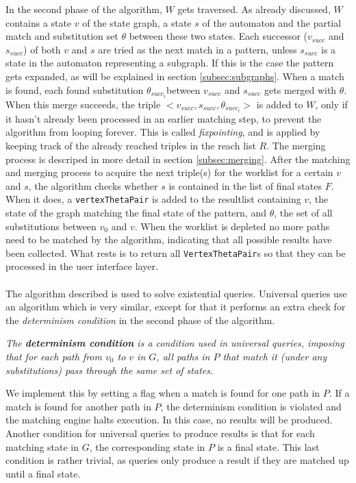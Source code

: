 In the second phase of the algorithm, $W$ gets traversed. As already discussed, $W$ contains a state $v$ of the state graph, a state $s$ of the automaton and the partial match and substitution set $\theta$ between these two states. Each successor ($v_{succ}$ and $s_{succ}$) of both $v$ and $s$ are tried as the next match in a pattern, unless $s_{succ}$ is a state in the automaton representing a subgraph. If this is the case the pattern gets expanded, as will be explained in section \ref{subsec:subgraphs}. When a match is found, each found substitution $\theta_{succ_i}$between $v_{succ}$ and $s_{succ}$ gets merged with $\theta$. When this merge succeeds, the triple $<v_{succ}, s_{succ}, \theta_{succ_i}>$ is added to $W$, only if it hasn't already been processed in an earlier matching step, to prevent the algorithm from looping forever. This is called \textit{fixpointing}, and is applied by keeping track of the already reached triples in the reach list $R$. The merging process is descriped in more detail in section \ref{subsec:merging}. After the matching and merging process to acquire the next triple(s) for the worklist for a certain $v$ and $s$, the algorithm checks whether $s$ is contained in the list of final states $F$. When it does, a \texttt{vertexThetaPair} is added to the resultlist containing $v$, the state of the graph matching the final state of the pattern, and $\theta$, the set of all substitutions between $v_0$ and $v$. When the worklist is depleted no more paths need to be matched by the algorithm, indicating that all possible results have been collected. What rests is to return all \texttt{VertexThetaPair}s so that they can be processed in the user interface layer.
\\\\
\noindent The algorithm described is used to solve existential queries. Universal queries use an algorithm which is very similar, except for that it performs an extra check for the \textit{determinism condition} in the second phase of the algorithm. 
\begin{definition}
\textit{The \textbf{determinism condition} is a condition used in universal queries, imposing that for each path from $v_0$ to $v$ in $G$, all paths in $P$ that match it (under any substitutions) pass through the same set of states.}
\end{definition}
\noindent We implement this by setting a flag when a match is found for one path in $P$. If a match is found for another path in $P$, the determinism condition is violated and the matching engine halts execution. In this case, no results will be produced. Another condition for universal queries to produce results is that for each matching state in $G$, the corresponding state in $P$ is a final state. This last condition is rather trivial, as queries only produce a result if they are matched up until a final state.

